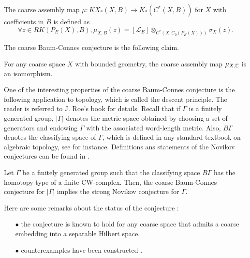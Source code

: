 \begin{definition}
The coarse assembly map $\mu:KX_*(X,B)\rightarrow K_*(C^*(X,B))$ for $X$ with coefficients in $B$ is defined as 
\[\forall z\in RK(P_E(X), B), \mu_{X,B}(z)=[\mathcal L_E]\otimes_{C^*(X,C_0(P_E(X)))} \sigma_X(z).\]
\end{definition}

The coarse Baum-Connes conjecture is the following claim.\\

\begin{conj}
For any coarse space $X$ with bounded geometry, the coarse assembly map $\mu_{X,\mathbb C}$ is an isomorphism.\\
\end{conj}


One of the interesting properties of the coarse Baum-Connes conjecture is the following application to topology, which is called the descent principle. The reader is referred to J. Roe's book \cite{RoeIndex} for details. Recall that if $\Gamma$ is a finitely generated group, $|\Gamma|$ denotes the metric space obtained by choosing a set of generators and endowing $\Gamma$ with the  associated word-length metric. Also, $B\Gamma$ denotes the classifying space of $\Gamma$, which is defined in any standard textbook on algebraic topology, see \cite{May} for instance. Definitions ans statements of the Novikov conjectures can be found in \cite{ferrynovikov}.

\begin{thm}
Let $\Gamma$ be a finitely generated group such that the classifying space $B\Gamma$ has the homotopy type of a finite CW-complex. Then, the coarse Baum-Connes conjecture for $|\Gamma |$ implies the strong Novikov conjecture for $\Gamma$. 
\end{thm}

Here are some remarks about the status of the conjecture :
\begin{itemize}
\item[$\bullet$] the conjecture is known to hold for any coarse space that admits a coarse embedding into a  separable Hilbert space\cite{Yu2}.
\item[$\bullet$] counterexamples have been constructed \cite{HigsonLaffSk}.\\
\end{itemize}

